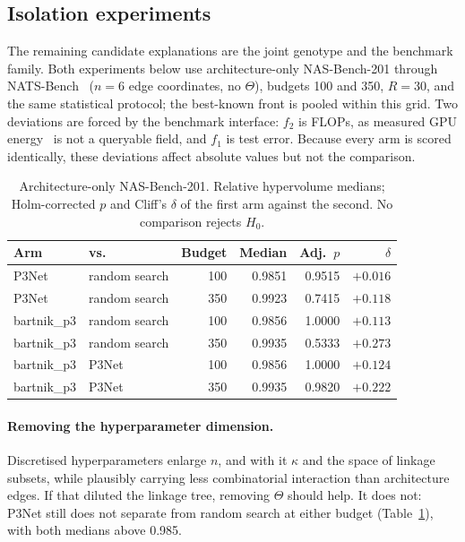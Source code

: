 \subsection{Isolation experiments}

The remaining candidate explanations are the joint genotype and the benchmark family. Both experiments below use
architecture-only NAS-Bench-201 through NATS-Bench~\citep{dong2021natsbench} ($n=6$ edge coordinates, no
$\Theta$), budgets 100 and 350, $R=30$, and the same statistical protocol; the best-known front is pooled within
this grid. Two deviations are forced by the benchmark interface: $f_2$ is FLOPs, as measured GPU
energy~\citep{bartnik2026evolutionary} is not a queryable field, and $f_1$ is test error. Because every arm is
scored identically, these deviations affect absolute values but not the comparison.

\begin{table}[t]
    \centering
    \footnotesize
    \caption{Architecture-only NAS-Bench-201. Relative hypervolume medians; Holm-corrected $p$ and Cliff's
    $\delta$ of the first arm against the second. No comparison rejects $H_0$.}
    \label{tab:isolation}
    \begin{tabular}{@{}llrrrr@{}}
        \toprule
        \textbf{Arm} & \textbf{vs.} & \textbf{Budget} & \textbf{Median} & \textbf{Adj.\ $p$} & \textbf{$\delta$} \\
        \midrule
        P3Net      & random search & 100 & 0.9851 & 0.9515 & $+0.016$ \\
        P3Net      & random search & 350 & 0.9923 & 0.7415 & $+0.118$ \\
        \midrule
        bartnik\_p3 & random search & 100 & 0.9856 & 1.0000 & $+0.113$ \\
        bartnik\_p3 & random search & 350 & 0.9935 & 0.5333 & $+0.273$ \\
        bartnik\_p3 & P3Net        & 100 & 0.9856 & 1.0000 & $+0.124$ \\
        bartnik\_p3 & P3Net        & 350 & 0.9935 & 0.9820 & $+0.222$ \\
        \bottomrule
    \end{tabular}
\end{table}

\paragraph{Removing the hyperparameter dimension.} Discretised hyperparameters enlarge $n$, and with it $\kappa$
and the space of linkage subsets, while plausibly carrying less combinatorial interaction than architecture edges.
If that diluted the linkage tree, removing $\Theta$ should help. It does not: P3Net still does not separate from
random search at either budget (Table~\ref{tab:isolation}), with both medians above 0.985.

